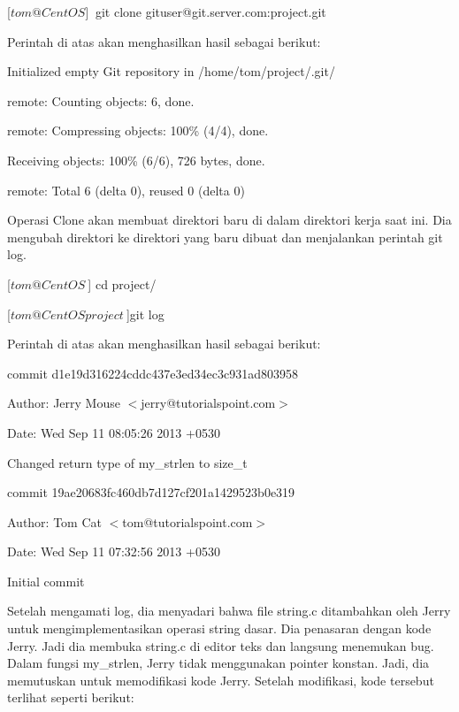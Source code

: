 \documentclass[12pt,a4paper]{article}
\begin{document}
[$tom@CentOS ]~$ git clone gituser@git.server.com:project.git\vspace{12pt}

Perintah di atas akan menghasilkan hasil sebagai berikut:\vspace{12pt}

Initialized empty Git repository in /home/tom/project/.git/

remote: Counting objects: 6, done.

remote: Compressing objects: 100\% (4/4), done.

Receiving objects: 100\% (6/6), 726 bytes, done.

remote: Total 6 (delta 0), reused 0 (delta 0)\vspace{12pt}

Operasi Clone akan membuat direktori baru di dalam direktori kerja saat 
ini. Dia mengubah direktori ke direktori yang baru dibuat dan 
menjalankan perintah git log.\vspace{12pt}

[$tom@CentOS ~$] cd project/

[$tom@CentOS project ~$]git log\vspace{12pt}

Perintah di atas akan menghasilkan hasil sebagai berikut:\vspace{12pt}

commit d1e19d316224cddc437e3ed34ec3c931ad803958

Author: Jerry Mouse $<$jerry@tutorialspoint.com$>$

Date: Wed Sep 11 08:05:26 2013 +0530

Changed return type of my\_strlen to size\_t

commit 19ae20683fc460db7d127cf201a1429523b0e319

Author: Tom Cat $<$tom@tutorialspoint.com$>$

Date: Wed Sep 11 07:32:56 2013 +0530

Initial commit\vspace{12pt}

Setelah mengamati log, dia menyadari bahwa file string.c ditambahkan 
oleh Jerry untuk mengimplementasikan operasi string dasar. Dia penasaran 
dengan kode Jerry. Jadi dia membuka string.c di editor teks dan langsung 
menemukan bug. Dalam fungsi my\_strlen, Jerry tidak menggunakan pointer 
konstan. Jadi, dia memutuskan untuk memodifikasi kode Jerry. Setelah 
modifikasi, kode tersebut terlihat seperti berikut:\vspace{12pt}
\end{document}
